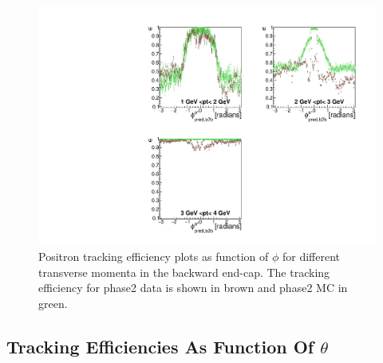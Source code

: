 \documentclass[a4paper,11pt,twosided,final,german,openbib,pdftex,listof=totoc,bibliography=totoc]{scrbook}
\begin{document}
\begin{figure}[!htbp]
	\centering
	\includegraphics[width=\textwidth]{Plots/master/xPtMPhiepEC}
	\caption[Transverse Momentum $\phi$ Positron Backward End-Cap Efficiency Phase2]{Positron tracking efficiency plots as function of $\phi$ for different transverse momenta in the backward end-cap. The tracking efficiency for phase2 data is shown in brown and phase2 MC in green.
		\label{plt:xPtMPhiepEC}	}
\end{figure}

\newpage

\subsection{Tracking Efficiencies As Function Of $\theta$}
\end{document}
